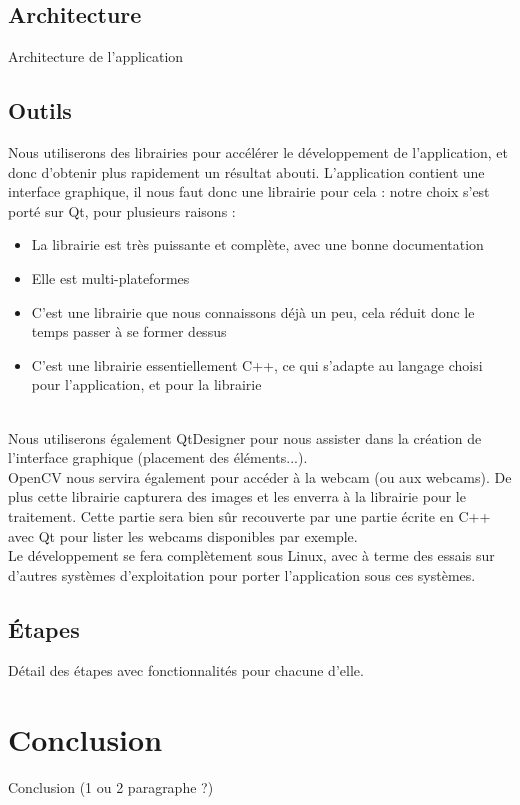 \documentclass{article}
\begin{document}
		\subsection{Architecture}
			Architecture de l'application
		\subsection{Outils}
			Nous utiliserons des librairies pour accélérer le développement de l'application, et donc d'obtenir plus 
rapidement un résultat abouti.
		L'application contient une interface graphique, il nous faut donc une librairie pour cela :
		notre choix s'est porté sur Qt, pour plusieurs raisons : 
		\begin{itemize}
			\item La librairie est très puissante et complète, avec une bonne documentation
			\item Elle est multi-plateformes
			\item C'est une librairie que nous connaissons déjà un peu, cela réduit donc le temps passer à se former dessus
			\item C'est une librairie essentiellement C++, ce qui s'adapte au langage choisi pour l'application, et pour la librairie
		\end{itemize} \ \\
Nous utiliserons également QtDesigner pour nous assister dans la création de l'interface graphique (placement des éléments...). \\
		
OpenCV nous servira également pour accéder à la webcam (ou aux webcams). De plus cette librairie capturera des images et les enverra à la librairie pour le traitement. Cette partie sera bien sûr recouverte par une partie écrite en C++ avec Qt pour lister les webcams disponibles par exemple. \\

		Le développement se fera complètement sous Linux, avec à terme des essais sur d'autres systèmes d'exploitation pour
porter l'application sous ces systèmes. \\ 

		\subsection{Étapes}
			Détail des étapes avec fonctionnalités pour chacune d'elle.
	\section{Conclusion}	
		Conclusion (1 ou 2 paragraphe ?)
	
\end{document}
